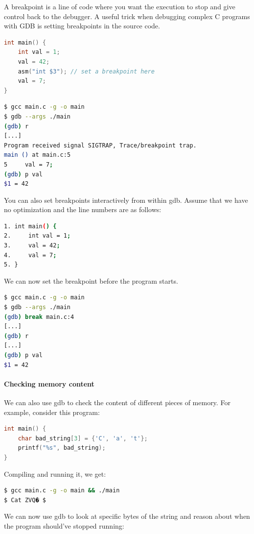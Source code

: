 A breakpoint is a line of code where you want the execution to stop and give control back to the debugger.
A useful trick when debugging complex C programs with GDB is setting breakpoints in the source code.

\begin{lstlisting}[language=C]
int main() {
    int val = 1;
    val = 42;
    asm("int $3"); // set a breakpoint here
    val = 7;
}
\end{lstlisting}

\begin{lstlisting}[language=bash]
$ gcc main.c -g -o main
$ gdb --args ./main
(gdb) r
[...]
Program received signal SIGTRAP, Trace/breakpoint trap.
main () at main.c:5
5     val = 7;
(gdb) p val
$1 = 42
\end{lstlisting}

You can also set breakpoints interactively from within gdb.
Assume that we have no optimization and the line numbers are as follows:

\begin{lstlisting}[language=bash]
1. int main() {
2.     int val = 1;
3.     val = 42;
4.     val = 7;
5. }
\end{lstlisting}

We can now set the breakpoint before the program starts.

\begin{lstlisting}[language=bash]
$ gcc main.c -g -o main
$ gdb --args ./main
(gdb) break main.c:4
[...]
(gdb) r
[...]
(gdb) p val
$1 = 42
\end{lstlisting}

\paragraph{Checking memory content}


We can also use gdb to check the content of different pieces of memory.
For example, consider this program:

\begin{lstlisting}[language=C]
int main() {
    char bad_string[3] = {'C', 'a', 't'};
    printf("%s", bad_string);
}
\end{lstlisting}

Compiling and running it, we get:

\begin{lstlisting}[language=bash]
$ gcc main.c -g -o main && ./main
$ Cat ZVQ� $
\end{lstlisting}


We can now use gdb to look at specific bytes of the string and reason about when the program should've stopped running:

